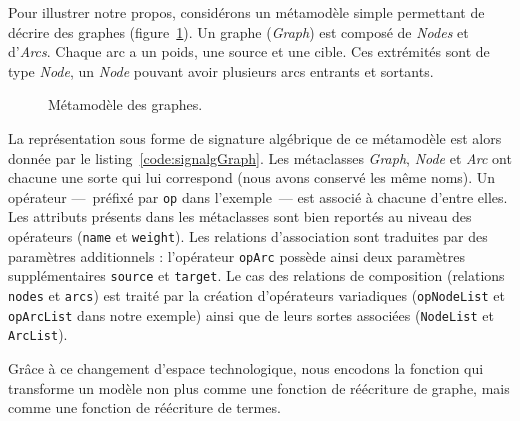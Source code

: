 Pour illustrer notre propos, considérons un métamodèle simple permettant de
décrire des graphes (figure~\ref{fig:graphmm}). Un graphe (\emph{Graph}) est
composé de \emph{Nodes} et d'\emph{Arcs}. Chaque arc a un poids, une source et
une cible. Ces extrémités sont de type \emph{Node}, un \emph{Node} pouvant
avoir plusieurs arcs entrants et sortants.
\begin{figure}[h]%
  \begin{center}
    
    \caption{Métamodèle des graphes.}
    \label{fig:graphmm}
  \end{center}
\end{figure}
La représentation sous forme de signature algébrique de ce métamodèle est alors
donnée par le listing~\ref{code:signalgGraph}. Les métaclasses \emph{Graph},
\emph{Node} et \emph{Arc} ont chacune une sorte qui lui correspond (nous avons
conservé les même noms). Un opérateur ---~préfixé par \texttt{op} dans
l'exemple~--- est associé à chacune d'entre elles. Les attributs présents dans
les métaclasses sont bien reportés au niveau des opérateurs (\texttt{name} et
\texttt{weight}). Les relations d'association sont traduites par des paramètres
additionnels : l'opérateur \texttt{opArc} possède ainsi deux paramètres
supplémentaires \texttt{source} et \texttt{target}. Le cas des relations de
composition (relations \texttt{nodes} et \texttt{arcs}) est traité par la
création d'opérateurs variadiques (\texttt{opNodeList} et \texttt{opArcList}
dans notre exemple) ainsi que de leurs sortes associées (\texttt{NodeList} et
\texttt{ArcList}).

\begin{figure}[H]
  \centering
  
\end{figure}


Grâce à ce changement d'espace technologique, nous encodons la fonction qui
transforme un modèle non plus comme une fonction de réécriture de graphe, mais
comme une fonction de réécriture de termes.


%

